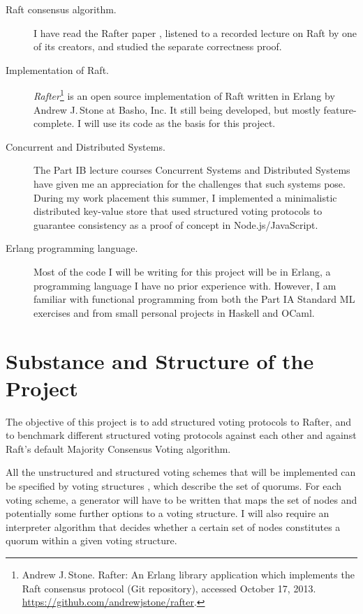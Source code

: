 \documentclass[12pt]{scrartcl}
\begin{document}
\begin{description}

	\item[Raft consensus algorithm.] I have read the Rafter paper \cite{raft}, listened to a recorded lecture on Raft by one of its creators, and studied the separate correctness proof.

\item[Implementation of Raft.] \emph{Rafter}\footnote{Andrew J.\,Stone. Rafter: An Erlang library application which implements the Raft consensus protocol (Git repository), accessed October 17, 2013. \url{https://github.com/andrewjstone/rafter}.} is an open source implementation of Raft written in Erlang by Andrew J.\,Stone at Basho, Inc. It still being developed, but mostly feature-complete. I will use its code as the basis for this project.

\item[Concurrent and Distributed Systems.] The Part \textsc{IB} lecture courses Concurrent Systems and Distributed Systems have given me an appreciation for the challenges that such systems pose. During my work placement this summer, I implemented a minimalistic distributed key-value store that used structured voting protocols to guarantee consistency as a proof of concept in Node.js/JavaScript.

\item[Erlang programming language.] Most of the code I will be writing for this project will be in Erlang, a programming language I have no prior experience with. However, I am familiar with functional programming from both the Part \textsc{IA} Standard \textsc{ML} exercises and from small personal projects in Haskell and OCaml.

\end{description}


\section{Substance and Structure of the Project%
  \label{substance-and-structure-of-the-project}%
}

The objective of this project is to add structured voting protocols to Rafter, and to benchmark different structured voting protocols against each other and against Raft's default Majority Consensus Voting algorithm.

All the unstructured and structured voting schemes that will be implemented can be specified by voting structures \cite{voting}, which describe the set of quorums. For each voting scheme, a generator will have to be written that maps the set of nodes and potentially some further options to a voting structure. I will also require an interpreter algorithm that decides whether a certain set of nodes constitutes a quorum within a given voting structure.
\end{document}
